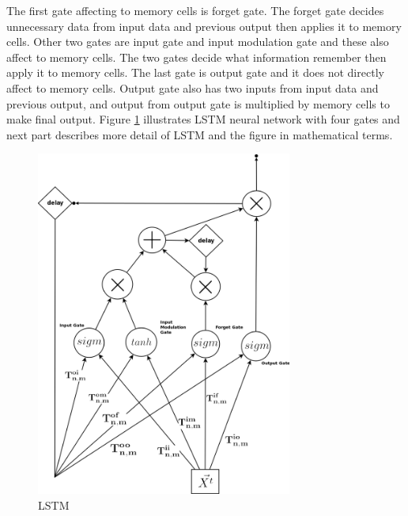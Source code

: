 \documentclass[draft,dvipsnames]{drexel-thesis}
\begin{document}
\begin{thesis}
\begin{enumerate}
	The first gate affecting to memory cells is forget gate. The forget gate decides unnecessary data from input data and previous output then applies it to memory cells. Other two gates are input gate and input modulation gate and these also affect to memory cells. The two gates decide what information remember then apply it to memory cells. The last gate is output gate and it does not directly affect to memory cells. Output gate also has two inputs from input data and previous output, and output from output gate is multiplied by memory cells to make final output. Figure \ref{fig:LSTM} illustrates LSTM neural network with four gates and next part describes more detail of LSTM and the figure in mathematical terms.

\begin{figure}[t!]
    \centering
    \includegraphics[width=0.75\textwidth]{pictures/figures/LSTM.png}
    \caption{LSTM}
    \label{fig:LSTM}
\end{figure}



\end{enumerate}
\end{thesis}
\end{document}

